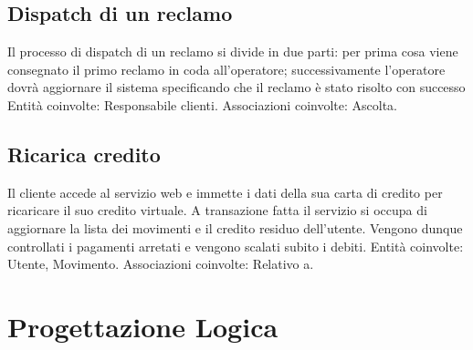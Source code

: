 \documentclass[11pt,a4paper] {article}
\begin{document}
\subsection{Dispatch di un reclamo}
Il processo di dispatch di un reclamo si divide in due parti: per prima cosa viene consegnato il primo reclamo in coda all'operatore; successivamente l'operatore dovrà aggiornare il sistema specificando che il reclamo è stato risolto con successo
\newline
\newline
Entit\`a coinvolte: Responsabile clienti.
\newline
Associazioni coinvolte: Ascolta.

\subsection{Ricarica credito}
Il cliente accede al servizio web e immette i dati della sua carta di credito per ricaricare il suo credito virtuale. A transazione fatta il servizio si occupa di aggiornare la lista dei movimenti e il credito residuo dell'utente. Vengono dunque controllati i pagamenti arretati e vengono scalati subito i debiti.
\newline
\newline
Entit\`a coinvolte: Utente, Movimento.
\newline
Associazioni coinvolte: Relativo a.

\section{Progettazione Logica}
\end{document}
